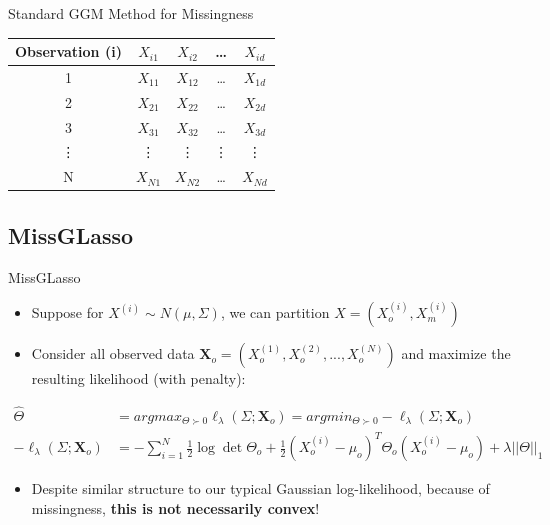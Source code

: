 \documentclass{beamer}
\begin{document}
\begin{frame}{Standard GGM Method for Missingness}
    
    \begin{center}
        \begin{tabular}{|c||c c c c||} 
         \hline
         Observation (i) & $X_{i1}$ & $X_{i2}$ & \dots & $X_{id}$ \\ [0.5ex] 
         \hline\hline
         1 &  $X_{11}$ & $X_{12}$ & \dots & $X_{1d}$ \\ 
         \hline
         2 & $X_{21}$ & $X_{22}$ & \dots & $X_{2d}$ \\
         \hline
         3 & $X_{31}$ & $X_{32}$ & \dots & $X_{3d}$ \\
         \hline
         \vdots & \vdots & \vdots & \vdots & \vdots \\
         \hline
         N &  $X_{N1}$ & $X_{N2}$ & \dots & $X_{Nd}$\\ [1ex] 
         \hline
        \end{tabular}
        \end{center}
\end{frame}
\fi 

\subsection{MissGLasso}

\begin{frame}{MissGLasso}
    \begin{itemize}
        \item Suppose for $X^{(i)} \sim N(\mu, \Sigma)$, we can partition $X = (X^{(i)}_o, X^{(i)}_m)$
        \item Consider all observed data $\mathbf{X}_o = (X_o^{(1)}, X_o^{(2)}, ..., X_o^{(N)})$ and maximize the resulting likelihood (with penalty):
    \end{itemize}
    
    \begin{align*}
        \hat\Theta 
        &= 
        argmax_{\Theta\succ 0}
        \ell_\lambda(\Sigma; \mathbf{X}_o)
        =
        argmin_{\Theta\succ 0}
        -\ell_\lambda(\Sigma; \mathbf{X}_o)
        \\
        -
        \ell_\lambda(\Sigma; \mathbf{X}_o)
        &=
        -
        \sum_{i=1}^N 
        \frac{1}{2} \log \det \Theta_o
        +
        \frac{1}{2} (X_o^{(i)}-\mu_o)^T \Theta_o (X_o^{(i)} -\mu_o)
        +
        \lambda ||\Theta||_1
    \end{align*}

    \begin{itemize}
        \item Despite similar structure to our typical Gaussian log-likelihood, because of missingness, {\bf this is not necessarily convex}! 
    \end{itemize}
\end{frame}
\end{document}
